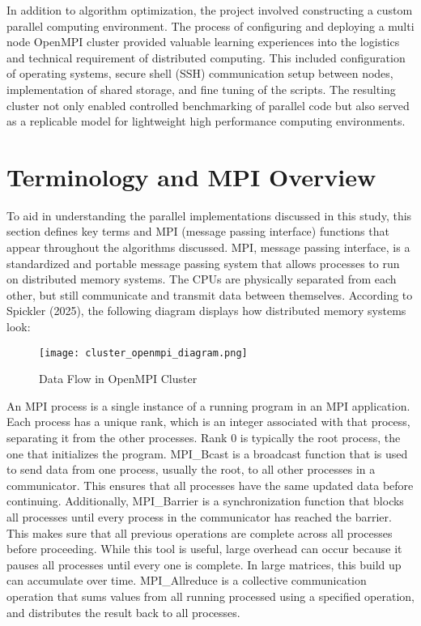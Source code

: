 \documentclass[12pt]{article}
\begin{document}
In addition to algorithm optimization, the project involved constructing a custom parallel computing environment. The process of configuring and deploying a multi node OpenMPI cluster provided valuable learning experiences into the logistics and technical requirement of distributed computing. This included configuration of operating systems, secure shell (SSH)  communication setup between nodes, implementation of shared storage, and fine tuning of the scripts. The resulting cluster not only enabled controlled benchmarking of parallel code but also served as a replicable model for lightweight high performance computing environments.

\section{Terminology and MPI Overview}
To aid in understanding the parallel implementations discussed in this study, this section defines key terms and MPI (message passing interface) functions that appear throughout the algorithms discussed. MPI, message passing interface, is a standardized and portable message passing system that allows processes to run on distributed memory systems. The CPUs are physically separated from each other, but still communicate and transmit data between themselves. According to Spickler (2025), the following diagram displays how distributed memory systems look:
\begin{figure}[H]
    \centering
    \texttt{[image: cluster\_openmpi\_diagram.png]}
    \caption{Data Flow in OpenMPI Cluster}
    \label{fig:mpi_diagram}
\end{figure}
An MPI process is a single instance of a running program in an MPI application. Each process has a unique rank, which is an integer associated with that process, separating it from the other processes. Rank 0 is typically the root process, the one that initializes the program. MPI_Bcast is a broadcast function that is used to send data from one process, usually the root, to all other processes in a communicator. This ensures that all processes have the same updated data before continuing. Additionally, MPI_Barrier is a synchronization function that blocks all processes until every process in the communicator has reached the barrier. This makes sure that all previous operations are complete across all processes before proceeding. While this tool is useful, large overhead can occur because it pauses all processes until every one is complete. In large matrices, this build up can accumulate over time. MPI_Allreduce is a collective communication operation that sums values from all running processed using a specified operation, and distributes the result back to all processes. 
\end{document}
